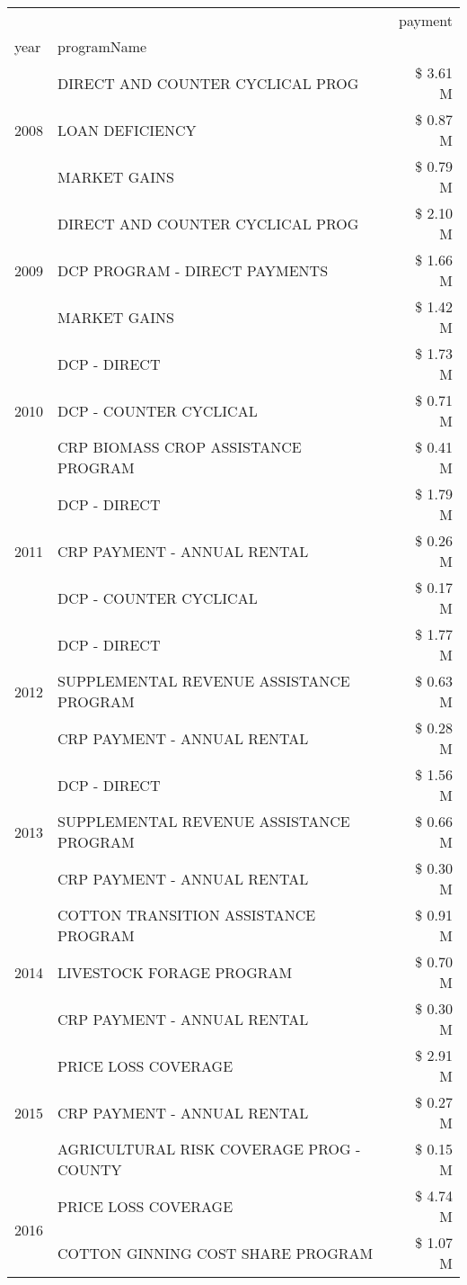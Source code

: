 \begin{tabular}{llr}
\toprule
 &  & payment \\
year & programName &  \\
\midrule
\multirow[t]{3}{*}{2008} & DIRECT AND COUNTER CYCLICAL PROG & \$ 3.61 M \\
 & LOAN DEFICIENCY & \$ 0.87 M \\
 & MARKET GAINS & \$ 0.79 M \\
\cline{1-3}
\multirow[t]{3}{*}{2009} & DIRECT AND COUNTER CYCLICAL PROG & \$ 2.10 M \\
 & DCP PROGRAM - DIRECT PAYMENTS & \$ 1.66 M \\
 & MARKET GAINS & \$ 1.42 M \\
\cline{1-3}
\multirow[t]{3}{*}{2010} & DCP - DIRECT & \$ 1.73 M \\
 & DCP - COUNTER CYCLICAL & \$ 0.71 M \\
 & CRP BIOMASS CROP ASSISTANCE PROGRAM & \$ 0.41 M \\
\cline{1-3}
\multirow[t]{3}{*}{2011} & DCP - DIRECT & \$ 1.79 M \\
 & CRP PAYMENT - ANNUAL RENTAL & \$ 0.26 M \\
 & DCP - COUNTER CYCLICAL & \$ 0.17 M \\
\cline{1-3}
\multirow[t]{3}{*}{2012} & DCP - DIRECT & \$ 1.77 M \\
 & SUPPLEMENTAL REVENUE ASSISTANCE PROGRAM & \$ 0.63 M \\
 & CRP PAYMENT - ANNUAL RENTAL & \$ 0.28 M \\
\cline{1-3}
\multirow[t]{3}{*}{2013} & DCP - DIRECT & \$ 1.56 M \\
 & SUPPLEMENTAL REVENUE ASSISTANCE PROGRAM & \$ 0.66 M \\
 & CRP PAYMENT - ANNUAL RENTAL & \$ 0.30 M \\
\cline{1-3}
\multirow[t]{3}{*}{2014} & COTTON TRANSITION ASSISTANCE PROGRAM & \$ 0.91 M \\
 & LIVESTOCK FORAGE PROGRAM & \$ 0.70 M \\
 & CRP PAYMENT - ANNUAL RENTAL & \$ 0.30 M \\
\cline{1-3}
\multirow[t]{3}{*}{2015} & PRICE LOSS COVERAGE & \$ 2.91 M \\
 & CRP PAYMENT - ANNUAL RENTAL & \$ 0.27 M \\
 & AGRICULTURAL RISK COVERAGE PROG - COUNTY & \$ 0.15 M \\
\cline{1-3}
\multirow[t]{3}{*}{2016} & PRICE LOSS COVERAGE & \$ 4.74 M \\
 & COTTON GINNING COST SHARE PROGRAM & \$ 1.07 M \\

\end{tabular}
